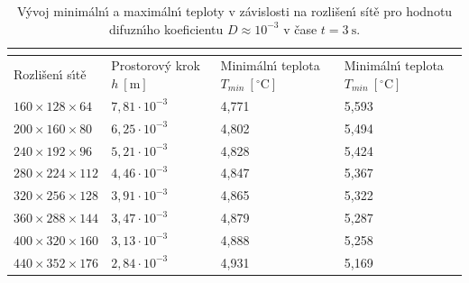             \begin{table}[H]
                \centering
                \begin{tabular}{p{}p{}p{}p{}}
                    \toprule
                    \multicolumn{4}{c}{\centering{$t=3.0 \ \mathrm{s}$}} \\ \midrule
                    Rozli\v{s}en\'{\i} s\'{\i}t\v{e} & \multicolumn{1}{p{2.5cm}}{Prostorov\'{y} krok $h \ [\mathrm{m}]$} & \multicolumn{1}{p{2.8cm}}{Minim\'{a}ln\'{\i} teplota $T_{min} \ [^\circ\mathrm{C}]$} & \multicolumn{1}{p{2.8cm}}{Minim\'{a}ln\'{\i} teplota $T_{min} \ [^\circ\mathrm{C}]$} \\ \midrule
                    $160 \times 128 \times 64$  & $7,81 \cdot  10^{-3}$ & 4,771 & 5,593 \\
                    $200 \times 160 \times 80$  & $6,25 \cdot  10^{-3}$ & 4,802 & 5,494 \\
                    $240 \times 192 \times 96$  & $5,21 \cdot  10^{-3}$ & 4,828 & 5,424 \\
                    $280 \times 224 \times 112$  & $4,46 \cdot  10^{-3}$ & 4,847 & 5,367 \\
                    $320 \times 256 \times 128$  & $3,91 \cdot  10^{-3}$ & 4,865 & 5,322 \\
                    $360 \times 288 \times 144$  & $3,47 \cdot  10^{-3}$ & 4,879 & 5,287 \\
                    $400 \times 320 \times 160$  & $3,13 \cdot  10^{-3}$ & 4,888 & 5,258 \\
                    $440 \times 352 \times 176$  & $2,84 \cdot  10^{-3}$ & 4,931 & 5,169 \\ \bottomrule
                \end{tabular}
                \caption{V\'{y}voj minim\'{a}ln\'{\i} a maxim\'{a}ln\'{\i} teploty v z\'{a}vislosti na rozli\v{s}en\'{\i} s\'{i}t\v{e} pro hodnotu difuzn\'{\i}ho koeficientu $D \approx 10^{-3}$ v \v{c}ase $t = 3 \ \mathrm{s}$.}
                \label{table:D10m3_3}
            \end{table}

